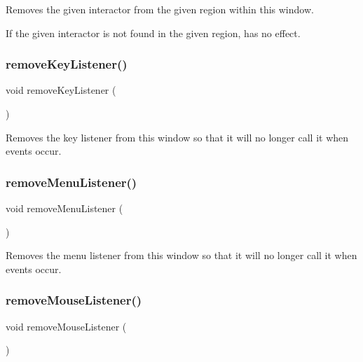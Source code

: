 Removes the given interactor from the given region within this window. 

If the given interactor is not found in the given region, has no effect. \mbox{\label{classGWindow_a43095f41cab3be732b49f29970484b05}} 
\subsubsection{\texorpdfstring{remove\+Key\+Listener()}{removeKeyListener()}}
{\footnotesize\ttfamily void remove\+Key\+Listener (\begin{DoxyParamCaption}{ }\end{DoxyParamCaption})\hspace{0.3cm}{\ttfamily [virtual]}}



Removes the key listener from this window so that it will no longer call it when events occur. 

\mbox{\label{classGWindow_a718d186fa807d6dec721c3b6f0c4309a}} 
\subsubsection{\texorpdfstring{remove\+Menu\+Listener()}{removeMenuListener()}}
{\footnotesize\ttfamily void remove\+Menu\+Listener (\begin{DoxyParamCaption}{ }\end{DoxyParamCaption})\hspace{0.3cm}{\ttfamily [virtual]}}



Removes the menu listener from this window so that it will no longer call it when events occur. 

\mbox{\label{classGWindow_aff47f71ce47e688a07c9d38dc92fcc11}} 
\subsubsection{\texorpdfstring{remove\+Mouse\+Listener()}{removeMouseListener()}}
{\footnotesize\ttfamily void remove\+Mouse\+Listener (\begin{DoxyParamCaption}{ }\end{DoxyParamCaption})\hspace{0.3cm}{\ttfamily [virtual]}}



